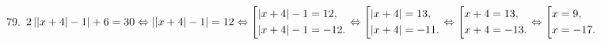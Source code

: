 79. $2\left||x+4|-1\right|+6=30\Leftrightarrow||x+4|-1|=12\Leftrightarrow\left[
      \begin{gathered} |x+4|-1=12,\hfill\\
      |x+4|-1=-12.\hfill \end{gathered}\right.\Leftrightarrow\left[
      \begin{gathered} |x+4|=13,\hfill\\
      |x+4|=-11.\hfill \end{gathered}\right.\Leftrightarrow\left[
      \begin{gathered} x+4=13,\hfill\\
      x+4=-13.\hfill \end{gathered}\right.\Leftrightarrow\left[
      \begin{gathered} x=9,\hfill\\
      x=-17.\hfill \end{gathered}\right.$\\
